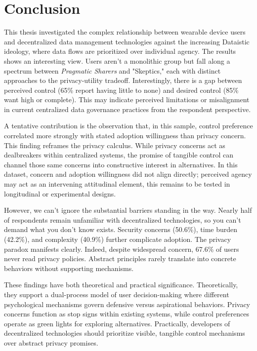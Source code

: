 \section{Conclusion}
This thesis investigated the complex relationship between wearable device users and decentralized data management technologies against the increasing Dataistic ideology, where data flows are prioritized over individual agency. The results shows an interesting view. Users aren't a monolithic group but fall along a spectrum between \textit{Pragmatic Sharers} and "Skeptics," each with distinct approaches to the privacy-utility tradeoff. Interestingly, there is a gap between perceived control (65\% report having little to none) and desired control (85\% want high or complete). This may indicate perceived limitations or misalignment in current centralized data governance practices from the respondent perspective.

A tentative contribution is the observation that, in this sample, control preference correlated more strongly with stated adoption willingness than privacy concern. This finding reframes the privacy calculus. While privacy concerns act as dealbreakers within centralized systems, the promise of tangible control can channel those same concerns into constructive interest in alternatives. In this dataset, concern and adoption willingness did not align directly; perceived agency may act as an intervening attitudinal element, this remains to be tested in longitudinal or experimental designs.

However, we can't ignore the substantial barriers standing in the way. Nearly half of respondents remain unfamiliar with decentralized technologies, so you can't demand what you don't know exists. Security concerns (50.6\%), time burden (42.2\%), and complexity (40.9\%) further complicate adoption. The privacy paradox manifests clearly. Indeed, despite widespread concern, 67.6\% of users never read privacy policies. Abstract principles rarely translate into concrete behaviors without supporting mechanisms.

These findings have both theoretical and practical significance. Theoretically, they support a dual-process model of user decision-making where different psychological mechanisms govern defensive versus aspirational behaviors. Privacy concerns function as stop signs within existing systems, while control preferences operate as green lights for exploring alternatives. Practically, developers of decentralized technologies should prioritize visible, tangible control mechanisms over abstract privacy promises.

